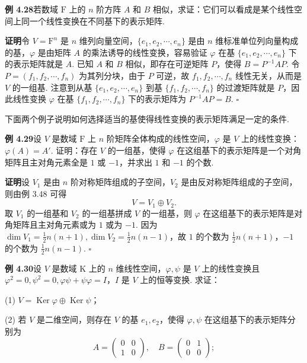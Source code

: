 \documentclass[UTF8,12pt,a4paper,fontset=fandol]{ctexart}
\begin{document}
\noindent\textbf{例 4.28}\quad 若数域 $\mathrm{F}$ 上的 $n$ 阶方阵 $A$ 和 $B$ 相似，求证：它们可以看成是某个线性空间上同一个线性变换在不同基下的表示矩阵.

\noindent\textbf{证明}\quad 令 $V=\mathrm{F}^n$ 是 $n$ 维列向量空间，$\{e_1,e_2,\cdots,e_n\}$ 是由 $n$ 维标准单位列向量构成的基，$\varphi$ 是由矩阵 $A$ 的乘法诱导的线性变换，容易验证 $\varphi$ 在基 $\{e_1,e_2,\cdots,e_n\}$ 下的表示矩阵就是 $A$. 已知 $A$ 和 $B$ 相似，即存在可逆矩阵 $P$，使得 $B=P^{-1}AP$. 令 $P=(f_1,f_2,\cdots,f_n)$ 为其列分块，由于 $P$ 可逆，故 $f_1,f_2,\cdots,f_n$ 线性无关，从而是 $V$ 的一组基. 注意到从基 $\{e_1,e_2,\cdots,e_n\}$ 到基 $\{f_1,f_2,\cdots,f_n\}$ 的过渡矩阵就是 $P$，因此线性变换 $\varphi$ 在基 $\{f_1,f_2,\cdots,f_n\}$ 下的表示矩阵为 $P^{-1}AP=B$. $\square$

下面两个例子说明如何选择适当的基使得线性变换的表示矩阵满足一定的条件.

\noindent\textbf{例 4.29}\quad 设 $V$ 是数域 $\mathrm{F}$ 上 $n$ 阶矩阵全体构成的线性空间，$\varphi$ 是 $V$ 上的线性变换：$\varphi(A)=A'$. 证明：存在 $V$ 的一组基，使得 $\varphi$ 在这组基下的表示矩阵是一个对角矩阵且主对角元素全是 $1$ 或 $-1$，并求出 $1$ 和 $-1$ 的个数.

\noindent\textbf{证明}\quad 设 $V_1$ 是由 $n$ 阶对称矩阵组成的子空间，$V_2$ 是由反对称矩阵组成的子空间，则由例 3.48 可得
\[
V=V_1\oplus V_2.
\]
取 $V_1$ 的一组基和 $V_2$ 的一组基拼成 $V$ 的一组基，则 $\varphi$ 在这组基下的表示矩阵是对角矩阵且主对角元素或为 $1$ 或为 $-1$. 因为 $\dim V_1=\frac12n(n+1),\dim V_2=\frac12n(n-1)$，故 $1$ 的个数为 $\frac12n(n+1)$，$-1$ 的个数为 $\frac12n(n-1)$. $\square$

\noindent\textbf{例 4.30}\quad 设 $V$ 是数域 $\mathrm{K}$ 上的 $n$ 维线性空间，$\varphi,\psi$ 是 $V$ 上的线性变换且 $\varphi^2=0,\psi^2=0,\varphi\psi+\psi\varphi=I$，$I$ 是 $V$ 上的恒等变换. 求证：

(1) $V=\operatorname{Ker}\varphi\oplus\operatorname{Ker}\psi$；

(2) 若 $V$ 是二维空间，则存在 $V$ 的基 $e_1,e_2$，使得 $\varphi,\psi$ 在这组基下的表示矩阵分别为
\[
A=\left(\begin{array}{cc}0&0\\1&0\end{array}\right),\quad
B=\left(\begin{array}{cc}0&1\\0&0\end{array}\right);
\]
\end{document}
